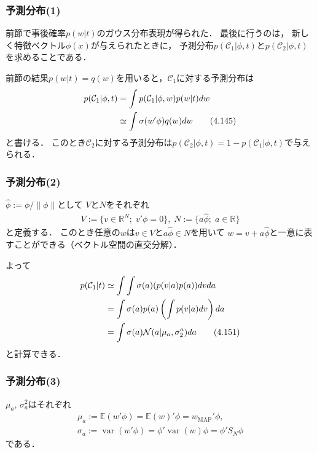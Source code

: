 \documentclass[10pt,%
hyperref={unicode}]{beamer}
\DeclareMathOperator*{\var}{var}
\begin{document}
\begin{frame}
    \frametitle{予測分布(1)}
    前節で事後確率$p(w|t)$のガウス分布表現が得られた．
    最後に行うのは，
    新しく特徴ベクトル$\phi(x)$が与えられたときに，
    予測分布$p(\mathcal{C}_1|\phi,t)$と$p(\mathcal{C}_2|\phi,t)$を求めることである．

    \bigskip

    前節の結果$p(w|t)=q(w)$を用いると，$\mathcal{C}_1$に対する予測分布は
    \begin{align}
        p(\mathcal{C}_1|\phi,t) &= \int p(\mathcal{C}_1|\phi,w)p(w|t)dw \notag \\
                                &\simeq \int \sigma(w'\phi)q(w)dw \tag{4.145}
    \end{align}
    と書ける．
    このとき$\mathcal{C}_2$に対する予測分布は$p(\mathcal{C}_2|\phi,t) = 1 - p(\mathcal{C}_1|\phi,t)$で与えられる．

\end{frame}

\begin{frame}
    \frametitle{予測分布(2)}
    $\hat{\phi}:=\phi/\|\phi\|$として
    $V$と$N$をそれぞれ
    \begin{gather*}
        V := \{v \in \mathbb{R}^N;\; v'\phi =0 \},\;
        N := \{a\hat{\phi};\;a \in \mathbb{R}\}
    \end{gather*}
    と定義する．
    このとき任意の$w$は$v \in V$と$a\hat{\phi}\in N$を用いて
    $w = v + a\hat{\phi}$と一意に表すことができる（ベクトル空間の直交分解）．

    \bigskip

    よって
    \begin{align}
        p(\mathcal{C}_1|t)
        &\simeq \int\int \sigma(a) (p(v|a)p(a))dvda \notag \\
        &= \int \sigma(a)p(a) \left(\int p(v|a) dv\right)da \notag \\
        &= \int \sigma(a)\mathcal{N}(a|\mu_a,\sigma_2^a)da \label{pc1t}
        \tag{4.151}
    \end{align}
    と計算できる．
\end{frame}

\begin{frame}
    \frametitle{予測分布(3)}
    $\mu_a,\,\sigma_a^2$はそれぞれ
    \begin{gather*}
        \mu_a := \mathbb{E}(w'\phi) = \mathbb{E}(w)'\phi = w_\mathrm{MAP}'\phi,\\
        \sigma_a := \var(w'\phi) = \phi'\var(w)\phi = \phi' S_N \phi
    \end{gather*}
    である．

\end{frame}
\end{document}
